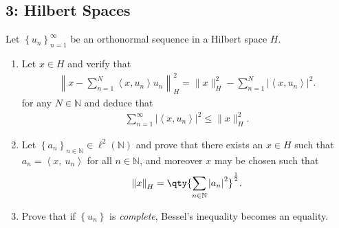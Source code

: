 \hypertarget{hilbert-spaces}{%
\subsection{3: Hilbert Spaces}\label{hilbert-spaces}}

\label{hilbert_space_exam_question}

Let \(\left\{{u_n}\right\}_{n=1}^\infty\) be an orthonormal sequence in
a Hilbert space \(H\).

\begin{enumerate}
\def\labelenumi{\alph{enumi}.}
\item
  Let \(x\in H\) and verify that
  \begin{align*}
  \left\|x-\sum_{n=1}^{N}\left\langle x, u_{n}\right\rangle u_{n}\right\|_H^{2}
  =
  \|x\|_H^{2}-\sum_{n=1}^{N}\left|\left\langle x, u_{n}\right\rangle\right|^{2}
  .\end{align*}
  for any \(N\in {\mathbb{N}}\) and deduce that
  \begin{align*}
  \sum_{n=1}^{\infty}\left|\left\langle x, u_{n}\right\rangle\right|^{2} \leq\|x\|_H^{2}
  .\end{align*}
\item
  Let
  \(\left\{{a_n}\right\}_{n\in {\mathbb{N}}} \in \ell^2({\mathbb{N}})\)
  and prove that there exists an \(x\in H\) such that
  \(a_n = {\left\langle {x},~{u_n} \right\rangle}\) for all
  \(n\in {\mathbb{N}}\), and moreover \(x\) may be chosen such that
  \begin{align*}
  {\left\lVert {x} \right\rVert}_H = \qty{ \sum_{n\in {\mathbb{N}}} {\left\lvert {a_n} \right\rvert}^2}^{1\over 2}
  .\end{align*}
\item
  Prove that if \(\left\{{u_n}\right\}\) is \emph{complete}, Bessel's
  inequality becomes an equality.
\end{enumerate}

